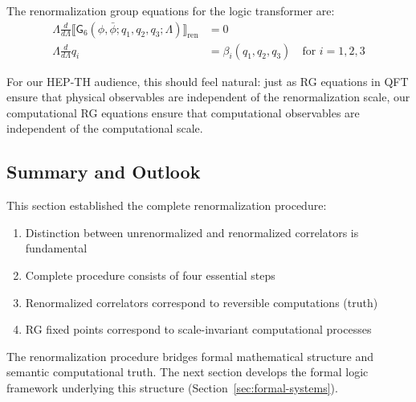 \begin{definition}
\label{def:rg-equations-renorm}
The renormalization group equations for the logic transformer are:
\begin{align}
\Lambda \frac{d}{d\Lambda} \llbracket \mathsf{G}_6(\phi,\bar{\phi};q_1,q_2,q_3;\Lambda)\rrbracket_{\text{ren}} &= 0\\
\Lambda \frac{d}{d\Lambda} q_i &= \beta_i(q_1,q_2,q_3) \quad \text{for } i = 1,2,3
\end{align}
\end{definition}

For our HEP-TH audience, this should feel natural: just as RG equations in QFT ensure that physical observables are independent of the renormalization scale, our computational RG equations ensure that computational observables are independent of the computational scale.

\subsection{Summary and Outlook}

This section established the complete renormalization procedure:

\begin{enumerate}
\item Distinction between unrenormalized and renormalized correlators is fundamental
\item Complete procedure consists of four essential steps
\item Renormalized correlators correspond to reversible computations (truth)
\item RG fixed points correspond to scale-invariant computational processes
\end{enumerate}

The renormalization procedure bridges formal mathematical structure and semantic computational truth. The next section develops the formal logic framework underlying this structure (Section~\ref{sec:formal-systems}).
